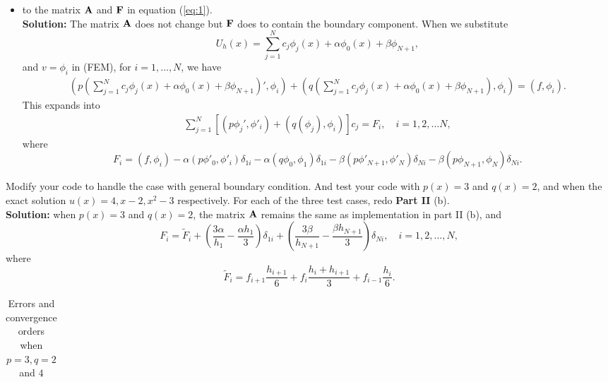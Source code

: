 \documentclass[11pt]{article}      %
\begin{document}
\begin{enumerate}
\begin{enumerate}
\begin{itemize}
\begin{displaymath}
\begin{array}{l}
	\end{array}
	\right.
\end{displaymath}
\begin{displaymath}
	\phi_{N+1}(x) = \;\;\left\{
	\begin{array}{l}
		\frac{x - x_N}{h_{N+1}} \quad x\in I_{N+1}\\
		0 \quad \mbox{ otherwise }.
	\end{array}
	\right.
\end{displaymath}
\item[(d.4)] to the matrix ${\bf A}$ and ${\bf F}$ in equation (\ref{eq:1}). \\
{\bf Solution: } The matrix ${\bf A}$ does not change but ${\bf F}$ does to contain the boundary component. When we substitute 
$$U_h(x) = \sum_{j=1}^{N}c_j\phi_j(x) +\alpha \phi_0(x) +\beta\phi_{N+1}, $$ and $v = \phi_i$ in (FEM), for $i = 1,\ldots,N$, we have 
\begin{align*}
(p(\sum_{j=1}^{N}c_j\phi_j(x) +\alpha \phi_0(x) +\beta\phi_{N+1})',\phi_i)	+ (q(\sum_{j=1}^{N}c_j\phi_j(x) +\alpha \phi_0(x) +\beta\phi_{N+1}),\phi_i) = (f,\phi_i).
\end{align*}
This expands into 
\begin{align}
	\sum_{j=1}^{N}[(p\phi_j',\phi'_i) + (q(\phi_j),\phi_i)]c_j = F_i, \quad i = 1,2,\ldots N,
\end{align}
where 
$$F_i = (f,\phi_i) - \alpha(p\phi'_0,\phi'_i)\delta_{1i} - \alpha(q\phi_0,\phi_1)\delta_{1i} -\beta(p\phi'_{N+1},\phi'_N)\delta_{Ni}-\beta(p\phi_{N+1},\phi_N)\delta_{Ni}.$$
\end{itemize} 
Modify your code to handle the case with general boundary condition. And test your code with $p(x)=3$ and $q(x)=2$,  and when  the exact solution $u(x)=4, x-2, x^2-3$ respectively. For each of the three test cases, redo {\bf Part II} (b). \\
{\bf Solution: }
when $p(x) = 3$ and $q(x) =2$, the matrix ${\bf A} $ remains the same as implementation in part II (b), and 
$$
F_i = \tilde{F}_i + (\frac{3\alpha}{h_1} -\frac{\alpha h_1}{3})\delta_{1i} + (\frac{3\beta}{h_{N+1}} -\frac{\beta h_{N+1}}{3})\delta_{Ni}, \quad i =1,2,\ldots,N,
$$
where
$$
\tilde{F}_i = f_{i+1}\frac{h_{i+1}}{6} + f_i\frac{h_i + h_{i+1}}{3} + f_{i-1}\frac{h_{i}}{6}.
$$
\begin{table}[!h]
\caption{Errors and convergence orders when $p=3, q=2$ and $4$}
\vspace{0.1in}
\centering
\begin{tabular}{|c|c|c| c| c| c| c|}
	\hline

\end{tabular}
\end{table}
\end{enumerate}
\end{enumerate}
\end{document}
